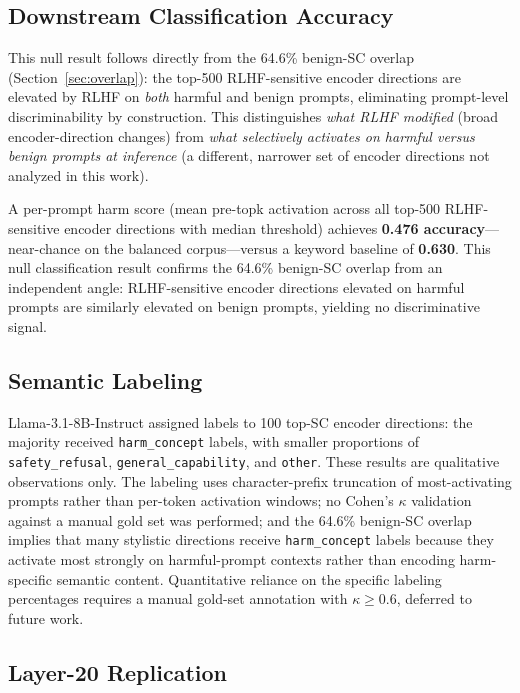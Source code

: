 \documentclass[11pt,letterpaper]{article}
\begin{document}
\subsection{Downstream Classification Accuracy}

This null result follows directly from the 64.6\% benign-SC overlap (Section~\ref{sec:overlap}): the
top-500 RLHF-sensitive encoder directions are elevated by RLHF on \emph{both} harmful and benign
prompts, eliminating prompt-level discriminability by construction. This distinguishes \emph{what
RLHF modified} (broad encoder-direction changes) from \emph{what selectively activates on harmful
versus benign prompts at inference} (a different, narrower set of encoder directions not analyzed in
this work).

A per-prompt harm score (mean pre-topk activation across all top-500 RLHF-sensitive encoder
directions with median threshold) achieves \textbf{0.476 accuracy}---near-chance on the balanced
corpus---versus a keyword baseline of \textbf{0.630}. This null classification result confirms the
64.6\% benign-SC overlap from an independent angle: RLHF-sensitive encoder directions elevated on
harmful prompts are similarly elevated on benign prompts, yielding no discriminative signal.

\subsection{Semantic Labeling}

Llama-3.1-8B-Instruct assigned labels to 100 top-SC encoder directions: the majority received
\texttt{harm\_concept} labels, with smaller proportions of \texttt{safety\_refusal},
\texttt{general\_capability}, and \texttt{other}. These results are qualitative observations only.
The labeling uses character-prefix truncation of most-activating prompts rather than per-token
activation windows; no Cohen's $\kappa$ validation against a manual gold set was performed; and the
64.6\% benign-SC overlap implies that many stylistic directions receive \texttt{harm\_concept} labels
because they activate most strongly on harmful-prompt contexts rather than encoding harm-specific
semantic content. Quantitative reliance on the specific labeling percentages requires a manual
gold-set annotation with $\kappa \geq 0.6$, deferred to future work.

\subsection{Layer-20 Replication}
\end{document}
